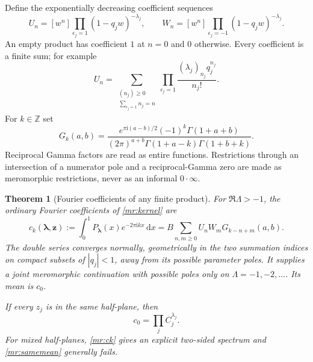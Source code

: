 \documentclass[11pt]{article}
\numberwithin{equation}{section}
\theoremstyle{plain}
\newtheorem{theorem}{Theorem}[section]
\theoremstyle{definition}
\theoremstyle{remark}
\newcommand{\Z}{\mathbb Z}
\newcommand{\ii}{\mathrm i}
\newcommand{\dd}{\,\mathrm d}
\begin{document}
Define the exponentially decreasing coefficient sequences
\begin{equation}\label{mr:UV}
 U_n=[w^n]\prod_{\epsilon_j=1}(1-q_jw)^{-\lambda_j},\qquad
 W_n=[w^n]\prod_{\epsilon_j=-1}(1-q_jw)^{-\lambda_j}.
\end{equation}
An empty product has coefficient $1$ at $n=0$ and $0$ otherwise.
Every coefficient is a finite sum; for example
\[
 U_n=\sum_{\substack{(n_j)\ge0\\\sum_{\epsilon_j=1}n_j=n}}
          \prod_{\epsilon_j=1}\frac{(\lambda_j)_{n_j}q_j^{n_j}}{n_j!}.
\]
For $k\in\Z$ set
\begin{equation}\label{mr:Gk}
 G_k(a,b)=
 \frac{e^{\pi\ii(a-b)/2}(-1)^k\Gamma(1+a+b)}
 {(2\pi)^{a+b}\Gamma(1+a-k)\Gamma(1+b+k)}.
\end{equation}
Reciprocal Gamma factors are read as entire functions. Restrictions
through an intersection of a numerator pole and a reciprocal-Gamma zero
are made as meromorphic restrictions, never as an informal $0\cdot\infty$.

\begin{theorem}[Fourier coefficients of any finite product]
\label{mr:fourier}
For $\Re\Lambda>-1$, the ordinary Fourier coefficients of
\eqref{mr:kernel} are
\begin{equation}\label{mr:ck}
 c_k(\boldsymbol\lambda,\mathbf z)
   :=\int_0^1P_{\boldsymbol\lambda}(x)e^{-2\pi\ii kx}\dd x
   =B\sum_{n,m\ge0}U_nW_mG_{k-n+m}(a,b).
\end{equation}
The double series converges normally, geometrically in the two summation
indices on compact subsets of $|q_j|<1$, away from its possible parameter
poles. It supplies a joint meromorphic continuation with possible poles
only on $\Lambda=-1,-2,\ldots$. Its mean is $c_0$.

If every $z_j$ is in the same half-plane, then
\begin{equation}\label{mr:samemean}
                         c_0=\prod_jC_j^{\lambda_j}.
\end{equation}
For mixed half-planes, \eqref{mr:ck} gives an explicit two-sided
spectrum and \eqref{mr:samemean} generally fails.
\end{theorem}
\end{document}
